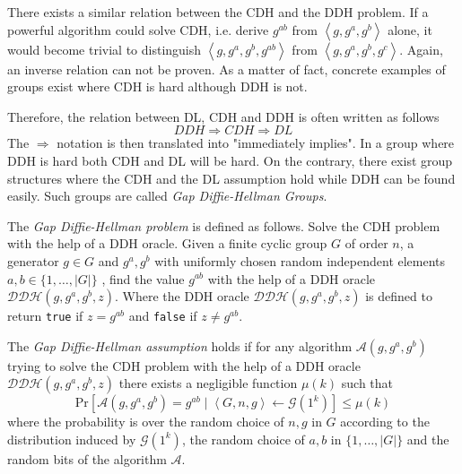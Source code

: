 There exists a similar relation between the CDH and the DDH problem. If a powerful algorithm could solve CDH, i.e. derive $g^{ab}$ from $\left< g, g^a, g^b \right>$ alone, it would become trivial to distinguish $\left< g, g^a, g^b, g^{ab} \right>$ from $\left< g, g^a, g^b, g^c \right>$. Again, an inverse relation can not be proven. As a matter of fact, concrete examples of groups exist where CDH is hard although DDH is not.

Therefore, the relation between DL, CDH and DDH is often written as follows
\begin{equation*}
 DDH \Rightarrow CDH \Rightarrow DL
\end{equation*}
The $\Rightarrow$ notation is then translated into "immediately implies". In a group where DDH is hard both CDH and DL will be hard. On the contrary, there exist group structures where the CDH and the DL assumption hold while DDH can be found easily. Such groups are called \textit{Gap Diffie-Hellman Groups}.

\begin{defn}[GDH]
\label{def:gdh}
The \textit{Gap Diffie-Hellman problem} is defined as follows. Solve the CDH problem with the help of a DDH oracle. Given a finite cyclic group $G$ of order $n$, a generator $g \in G$ and $g^a, g^b$ with uniformly chosen random independent elements $a, b \in \{ 1, \ldots, | G |\}$ , find the value $g^{ab}$ with the help of a DDH oracle $\mathcal{DDH} \left( g, g^a, g^b, z \right)$. Where the DDH oracle $\mathcal{DDH} \left( g, g^a, g^b, z \right)$ is defined to return \texttt{true} if $z = g^{ab}$ and \texttt{false} if $z \neq g^{ab}$.

The \textit{Gap Diffie-Hellman assumption} holds if for any algorithm $\mathcal{A} \left( g, g^a, g^b \right)$ trying to solve the CDH problem with the help of a DDH oracle $\mathcal{DDH} \left( g, g^a, g^b, z \right)$ there exists a negligible function $\mu \left( k \right)$ such that 
 \begin{equation*}
  \textrm{Pr} \left[ \mathcal{A} \left( g, g^a, g^b \right) = g^{ab} \mid \left< G, n, g \right> \leftarrow \mathcal{G} \left( 1^{k} \right)\right] \leq \mu \left( k \right)
 \end{equation*}
 where the probability is over the random choice of $n, g$ in $G$ according to the distribution induced by $\mathcal{G} \left( 1^k \right)$, the random choice of $a, b$ in $\{ 1, \ldots, | G |\}$ and the random bits of the algorithm $\mathcal{A}$.
\end{defn}

